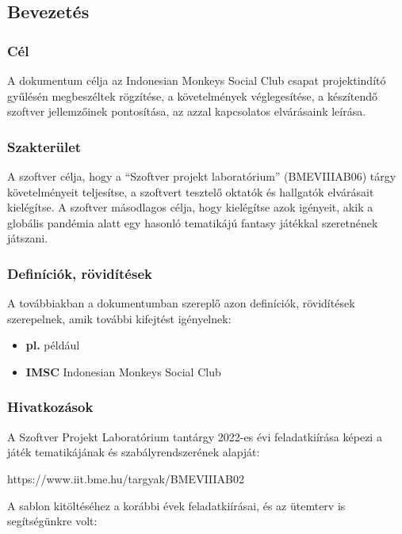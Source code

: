 \subsection{Bevezetés}

\subsubsection{Cél}

A dokumentum célja az Indonesian Monkeys Social Club csapat projektindító gyűlésén megbeszéltek rögzítése, a követelmények véglegesítése, a készítendő szoftver jellemzőinek pontosítása, az azzal kapcsolatos elvárásaink leírása.

\subsubsection{Szakterület}

A szoftver célja, hogy a “Szoftver projekt laboratórium” (BMEVIIIAB06) tárgy követelményeit teljesítse, a szoftvert tesztelő oktatók és hallgatók elvárásait kielégítse. A szoftver másodlagos célja, hogy kielégítse azok igényeit, akik a globális pandémia alatt egy hasonló tematikájú fantasy játékkal szeretnének játszani.

\subsubsection{Definíciók, rövidítések}

A továbbiakban a dokumentumban szereplő azon definíciók, rövidítések szerepelnek, amik további kifejtést igényelnek:

\begin{itemize}
	\item[] \textbf{pl.} például
	\item[] \textbf{IMSC} Indonesian Monkeys Social Club
\end{itemize}

\subsubsection{Hivatkozások}

A Szoftver Projekt Laboratórium tantárgy 2022-es évi feladatkiírása képezi a játék tematikájának és szabályrendszerének alapját:

https://www.iit.bme.hu/targyak/BMEVIIIAB02

A sablon kitöltéséhez a korábbi évek feladatkiírásai, és az ütemterv is segítségünkre volt:

